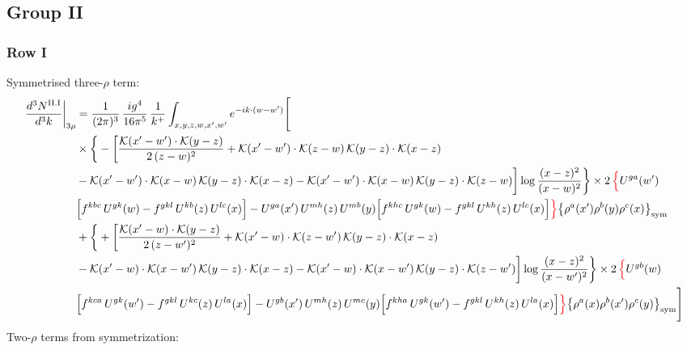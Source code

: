 \documentclass[9pt]{article}
\numberwithin{equation}{section}
\begin{document}
\subsection{Group II}
\subsubsection*{Row I}
Symmetrised three-$\rho$ term:
\begin{align}
\frac{d^{3}N^{\rm II.I}}{d^{3}k}\bigg|_{3\rho}&=\frac{1}{(2\pi)^{3}}\,\frac{ig^{4}}{16\pi^{5}}\,\frac{1}{k^{+}}\int_{x,y,z,w,x',w'}e^{-ik\cdot{(w-w')}}\Bigg[\notag\\
&\times\bigg\{-\bigg[\frac{\mathcal{K}(x'-w')\cdot\mathcal{K}(y-z)}{2\,(z-w)^{2}}+\mathcal{K}(x'-w')\cdot\mathcal{K}(z-w)\,\mathcal{K}(y-z)\cdot\mathcal{K}(x-z)\notag\\
&-\mathcal{K}(x'-w')\cdot\mathcal{K}(x-w)\,\mathcal{K}(y-z)\cdot\mathcal{K}(x-z)-\mathcal{K}(x'-w')\cdot\mathcal{K}(x-w)\,\mathcal{K}(y-z)\cdot\mathcal{K}(z-w)\bigg]\log\frac{(x-z)^{2}}{(x-w)^{2}}\bigg\}\times 2\,{\color{red}\Big\{}U^{ga}(w')\notag \\ & \Big[f^{kbc}\,U^{gk}(w)-f^{gkl}\,U^{kb}(z)\,U^{lc}(x)\Big]-U^{ga}(x')\,U^{mh}(z)\,U^{mb}(y)\Big[f^{khc}\,U^{gk}(w)-f^{gkl}\,U^{kh}(z)\,U^{lc}(x)\Big]{\color{red}\Big\}}\big\{\rho^{a}(x')\rho^{b}(y)\rho^{c}(x)\big\}_{\rm sym}\notag\\
&+\bigg\{+\bigg[\frac{\mathcal{K}(x'-w)\cdot\mathcal{K}(y-z)}{2\,(z-w')^{2}}+\mathcal{K}(x'-w)\cdot\mathcal{K}(z-w')\,\mathcal{K}(y-z)\cdot\mathcal{K}(x-z)\notag\\
&-\mathcal{K}(x'-w)\cdot\mathcal{K}(x-w')\,\mathcal{K}(y-z)\cdot\mathcal{K}(x-z)-\mathcal{K}(x'-w)\cdot\mathcal{K}(x-w')\,\mathcal{K}(y-z)\cdot\mathcal{K}(z-w')\bigg]\log\frac{(x-z)^{2}}{(x-w')^{2}}\bigg\}\times 2\,{\color{red}\Big\{}U^{gb}(w)\notag \\ & \Big[f^{kca}\,U^{gk}(w')-f^{gkl}\,U^{kc}(z)\,U^{la}(x)\Big]-U^{gb}(x')\,U^{mh}(z)\,U^{mc}(y)\Big[f^{kha}\,U^{gk}(w')-f^{gkl}\,U^{kh}(z)\,U^{la}(x)\Big]{\color{red}\Big\}}\big\{\rho^{a}(x)\rho^{b}(x')\rho^{c}(y)\big\}_{\rm sym}\Bigg]\label{eq:D-II.I-3}
\end{align}
Two-$\rho$ terms from symmetrization: 
\end{document}
